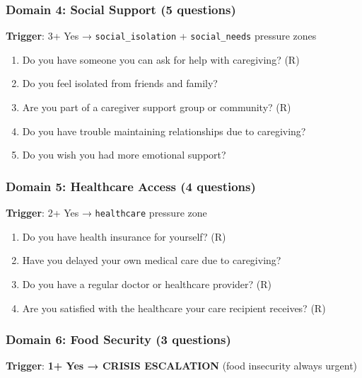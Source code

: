 \documentclass[
]{article}
\providecommand{\tightlist}{%
  \setlength{\itemsep}{0pt}\setlength{\parskip}{0pt}}
\begin{document}
\subsubsection{Domain 4: Social Support (5
questions)}\label{domain-4-social-support-5-questions}

\textbf{Trigger}: 3+ Yes → \texttt{social\_isolation} +
\texttt{social\_needs} pressure zones

\begin{enumerate}
\def\labelenumi{\arabic{enumi}.}
\setcounter{enumi}{11}
\tightlist
\item
  Do you have someone you can ask for help with caregiving? (R)
\item
  Do you feel isolated from friends and family?
\item
  Are you part of a caregiver support group or community? (R)
\item
  Do you have trouble maintaining relationships due to caregiving?
\item
  Do you wish you had more emotional support?
\end{enumerate}

\subsubsection{Domain 5: Healthcare Access (4
questions)}\label{domain-5-healthcare-access-4-questions}

\textbf{Trigger}: 2+ Yes → \texttt{healthcare} pressure zone

\begin{enumerate}
\def\labelenumi{\arabic{enumi}.}
\setcounter{enumi}{16}
\tightlist
\item
  Do you have health insurance for yourself? (R)
\item
  Have you delayed your own medical care due to caregiving?
\item
  Do you have a regular doctor or healthcare provider? (R)
\item
  Are you satisfied with the healthcare your care recipient receives?
  (R)
\end{enumerate}

\subsubsection{Domain 6: Food Security (3
questions)}\label{domain-6-food-security-3-questions}

\textbf{Trigger}: \textbf{1+ Yes → CRISIS ESCALATION} (food insecurity
always urgent)
\end{document}
